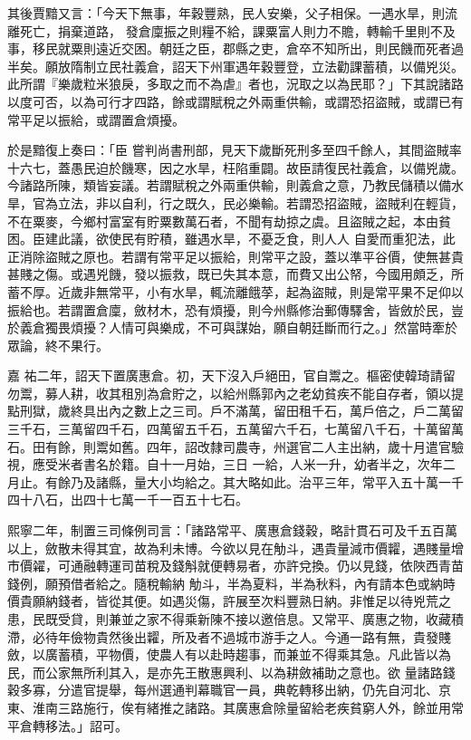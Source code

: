 \begin{pinyinscope}
 其後賈黯又言：「今天下無事，年穀豐熟，民人安樂，父子相保。一遇水旱，則流離死亡，捐棄道路，
 發倉廩振之則糧不給，課粟富人則力不贍，轉輸千里則不及事，移民就粟則遠近交困。朝廷之臣，郡縣之吏，倉卒不知所出，則民饑而死者過半矣。願放隋制立民社義倉，詔天下州軍遇年穀豐登，立法勸課蓄積，以備兇災。此所謂『樂歲粒米狼戾，多取之而不為虐』者也，況取之以為民耶？」下其說諸路以度可否，以為可行才四路，餘或謂賦稅之外兩重供輸，或謂恐招盜賊，或謂已有常平足以振給，或謂置倉煩擾。



 於是黯復上奏曰：「臣
 嘗判尚書刑部，見天下歲斷死刑多至四千餘人，其間盜賊率十六七，蓋愚民迫於饑寒，因之水旱，枉陷重闢。故臣請復民社義倉，以備兇歲。今諸路所陳，類皆妄議。若謂賦稅之外兩重供輸，則義倉之意，乃教民儲積以備水旱，官為立法，非以自利，行之既久，民必樂輸。若謂恐招盜賊，盜賊利在輕貨，不在粟麥，今鄉村富室有貯粟數萬石者，不聞有劫掠之虞。且盜賊之起，本由貧困。臣建此議，欲使民有貯積，雖遇水旱，不憂乏食，則人人
 自愛而重犯法，此正消除盜賊之原也。若謂有常平足以振給，則常平之設，蓋以準平谷價，使無甚貴甚賤之傷。或遇兇饑，發以振救，既已失其本意，而費又出公帑，今國用頗乏，所蓄不厚。近歲非無常平，小有水旱，輒流離餓莩，起為盜賊，則是常平果不足仰以振給也。若謂置倉廩，斂材木，恐有煩擾，則今州縣修治郵傳驛舍，皆斂於民，豈於義倉獨畏煩擾？人情可與樂成，不可與謀始，願自朝廷斷而行之。」然當時牽於眾論，終不果行。



 嘉
 祐二年，詔天下置廣惠倉。初，天下沒入戶絕田，官自鬻之。樞密使韓琦請留勿鬻，募人耕，收其租別為倉貯之，以給州縣郭內之老幼貧疾不能自存者，領以提點刑獄，歲終具出內之數上之三司。戶不滿萬，留田租千石，萬戶倍之，戶二萬留三千石，三萬留四千石，四萬留五千石，五萬留六千石，七萬留八千石，十萬留萬石。田有餘，則鬻如舊。四年，詔改隸司農寺，州選官二人主出納，歲十月遣官驗視，應受米者書名於籍。自十一月始，三日
 一給，人米一升，幼者半之，次年二月止。有餘乃及諸縣，量大小均給之。其大略如此。治平三年，常平入五十萬一千四十八石，出四十七萬一千一百五十七石。



 熙寧二年，制置三司條例司言：「諸路常平、廣惠倉錢穀，略計貫石可及千五百萬以上，斂散未得其宜，故為利未博。今欲以見在觔斗，遇貴量減市價糶，遇賤量增市價糴，可通融轉運司苗稅及錢斛就便轉易者，亦許兌換。仍以見錢，依陜西青苗錢例，願預借者給之。隨稅輸納
 觔斗，半為夏料，半為秋料，內有請本色或納時價貴願納錢者，皆從其便。如遇災傷，許展至次料豐熟日納。非惟足以待兇荒之患，民既受貸，則兼並之家不得乘新陳不接以邀倍息。又常平、廣惠之物，收藏積滯，必待年儉物貴然後出糶，所及者不過城市游手之人。今通一路有無，貴發賤斂，以廣蓄積，平物價，使農人有以赴時趨事，而兼並不得乘其急。凡此皆以為民，而公家無所利其入，是亦先王散惠興利、以為耕斂補助之意也。欲
 量諸路錢穀多寡，分遣官提舉，每州選通判幕職官一員，典乾轉移出納，仍先自河北、京東、淮南三路施行，俟有緒推之諸路。其廣惠倉除量留給老疾貧窮人外，餘並用常平倉轉移法。」詔可。




\end{pinyinscope}

